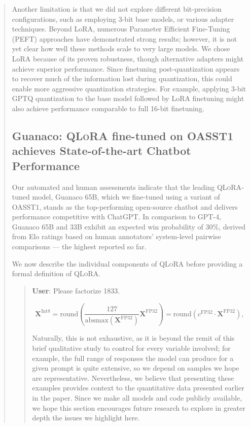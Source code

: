 \begin{quote}
Another limitation is that we did not explore different bit-precision configurations, such as employing 3-bit base models, or various adapter techniques. Beyond LoRA, numerous Parameter Efficient Fine-Tuning (PEFT) approaches have demonstrated strong results; however, it is not yet clear how well these methods scale to very large models. We chose LoRA because of its proven robustness, though alternative adapters might achieve superior performance. Since finetuning post-quantization appears to recover much of the information lost during quantization, this could enable more aggressive quantization strategies. For example, applying 3-bit GPTQ quantization to the base model followed by LoRA finetuning might also achieve performance comparable to full 16-bit finetuning.

\subsection{\textbf{Guanaco}: \textsc{QLoRA} fine-tuned on OASST1 achieves State-of-the-art Chatbot Performance} Our automated and human assessments indicate that the leading \textsc{QLoRA}-tuned model, {Guanaco} 65B, which we fine-tuned using a variant of OASST1, stands as the top-performing open-source chatbot and delivers performance competitive with ChatGPT. In comparison to GPT-4, {Guanaco} 65B and 33B exhibit an expected win probability of 30\%, derived from Elo ratings based on human annotators’ system-level pairwise comparisons — the highest reported so far.

We now describe the individual components of \textsc{QLoRA} before providing a formal definition of \textsc{QLoRA}.

\begin{quote}
    \textbf{User}: Please factorize 1833.

\begin{equation}
    \mathbf{X}^{ \text{Int8}} = \text{round}\left( \frac{127}{{\text{absmax}}(\mathbf{X}^{{\text{FP32}}})}\mathbf{X}^{{\text{FP32}}} \right) = \text{round}(c^{\text{FP32}}\cdot \mathbf{X}^{{\text{FP32}}}),
\end{equation}

Naturally, this is not exhaustive, as it is beyond the remit of this brief qualitative study to control for every variable involved; for example, the full range of responses the model can produce for a given prompt is quite extensive, so we depend on samples we hope are representative. Nevertheless, we believe that presenting these examples provides context to the quantitative data presented earlier in the paper. Since we make all models and code publicly available, we hope this section encourages future research to explore in greater depth the issues we highlight here.  

\end{quote}
\end{quote}
